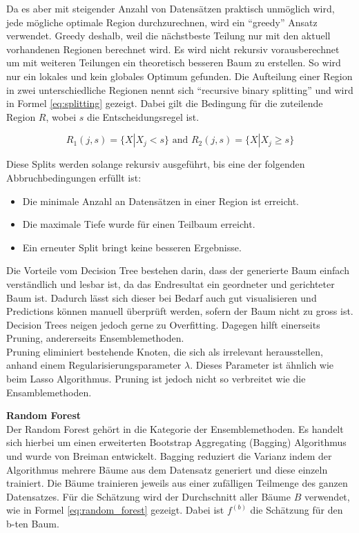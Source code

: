 Da es aber mit steigender Anzahl von Datensätzen praktisch unmöglich wird, jede mögliche optimale Region durchzurechnen, wird ein “greedy” Ansatz verwendet. Greedy deshalb, weil die nächstbeste Teilung nur mit den aktuell vorhandenen Regionen berechnet wird. Es wird nicht rekursiv vorausberechnet um mit weiteren Teilungen ein theoretisch besseren Baum zu erstellen. So wird nur ein lokales und kein globales Optimum gefunden. Die Aufteilung einer Region in zwei unterschiedliche Regionen nennt sich “recursive binary splitting” und wird in Formel \eqref{eq:splitting} gezeigt. Dabei gilt die Bedingung für die zuteilende Region $R$, wobei $s$ die Entscheidungsregel ist.

\begin{equation}\label{eq:splitting}
R_1(j,s) = \{X|X_j < s\} \text{ and } R_2(j,s) = \{X|X_j \geq s\}
\end{equation}

Diese Splits werden solange rekursiv ausgeführt, bis eine der folgenden Abbruchbedingungen erfüllt ist:

\begin{itemize}
\item Die minimale Anzahl an Datensätzen in einer Region ist erreicht.
\item Die maximale Tiefe wurde für einen Teilbaum erreicht.
\item Ein erneuter Split bringt keine besseren Ergebnisse.
\end{itemize}

Die Vorteile vom Decision Tree bestehen darin, dass der generierte Baum einfach verständlich und lesbar ist, da das Endresultat ein geordneter und gerichteter Baum ist. Dadurch lässt sich dieser bei Bedarf auch gut visualisieren und Predictions können manuell überprüft werden, sofern der Baum nicht zu gross ist.\\
Decision Trees neigen jedoch gerne zu Overfitting. Dagegen hilft einerseits Pruning, andererseits Ensemblemethoden.\\
Pruning eliminiert bestehende Knoten, die sich als irrelevant herausstellen, anhand einem Regularisierungsparameter $\lambda$. Dieses Parameter ist ähnlich wie beim Lasso Algorithmus. Pruning ist jedoch nicht so verbreitet wie die Ensamblemethoden.

\textbf{Random Forest}\\
Der Random Forest gehört in die Kategorie der Ensemblemethoden. Es handelt sich hierbei um einen erweiterten Bootstrap Aggregating (Bagging) Algorithmus und wurde von Breiman entwickelt. Bagging reduziert die Varianz indem der Algorithmus mehrere Bäume aus dem Datensatz generiert und diese einzeln trainiert.  Die Bäume trainieren jeweils aus einer zufälligen Teilmenge des ganzen Datensatzes. Für die Schätzung wird der Durchschnitt aller Bäume $B$ verwendet, wie in Formel \eqref{eq:random_forest} gezeigt. Dabei ist $f^{(b)}$ die Schätzung für den b-ten Baum.

